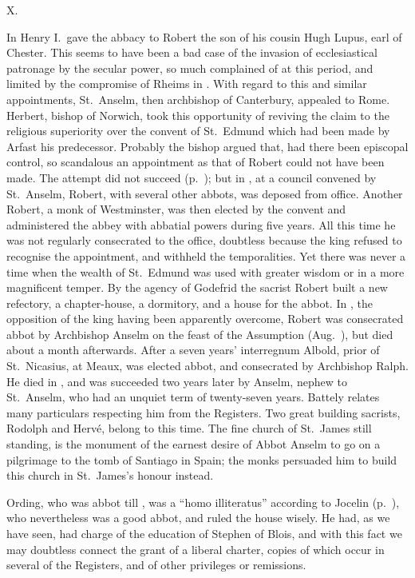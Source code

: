 \documentclass[10pt]{book}
\begin{document}
{\vspace{.3cm}
\begin{center}
X.
\end{center}
\noindent In  Henry I.\ gave the abbacy to Robert the son of his cousin Hugh Lupus, earl of Chester. This seems to have been a bad case of the invasion of ecclesiastical patronage by the secular power, so much complained of at this period, and limited by the compromise of Rheims in . With regard to this and similar appointments, St.\ Anselm, then archbishop of Canterbury, appealed to Rome. Herbert, bishop of Norwich, took this opportunity of reviving the claim to the religious superiority over the convent of St.\ Edmund which had been made by Arfast his predecessor. Probably the bishop argued that, had there been episcopal control, so scandalous an appointment as that of Robert could not have been made. The attempt did not succeed (p.\ ); but in , at a council convened by St.\ Anselm, Robert, with several other abbots, was deposed from office. Another Robert, a monk of Westminster, was then elected by the convent and administered the abbey with abbatial powers during five years. All this time he was not regularly consecrated to the office, doubtless because the king refused to recognise the appointment, and withheld the temporalities. Yet there was never a time when the wealth of St.\ Edmund was used with greater wisdom or in a more magnificent temper. By the agency of Godefrid the sacrist Robert built a new refectory, a chapter-house, a dormitory, and a house for the abbot. In , the opposition of the king having been apparently overcome, Robert was consecrated abbot by Archbishop Anselm on the feast of the Assumption (Aug.\ ), but died about a month afterwards. After a seven years' interregnum Albold, prior of St.\ Nicasius, at Meaux, was elected abbot, and consecrated by Archbishop Ralph. He died in , and was succeeded two years later by Anselm, nephew to St.\ Anselm, who had an unquiet term of twenty-seven years. Battely relates many particulars respecting him from the Registers. Two great building sacrists, Rodolph and Hervé, belong to this time. The fine church of St.\ James still standing, is the monument of the earnest desire of Abbot Anselm to go on a pilgrimage to the tomb of Santiago in Spain; the monks persuaded him to build this church in St.\ James's honour instead.

Ording, who was abbot till , was a ``homo illiteratus'' according to Jocelin (p.\ ), who nevertheless was a good abbot, and ruled the house wisely. He had, as we have seen, had charge of the education of Stephen of Blois, and with this fact we may doubtless connect the grant of a liberal charter, copies of which occur in several of the Registers, and of other privileges or remissions.

}
\end{document}
